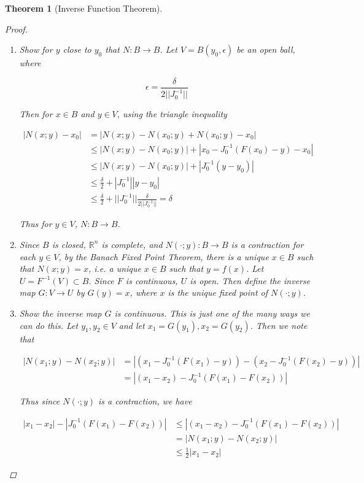 \documentclass{article}
\newtheorem{theorem}{Theorem}[section]
\def\R{{\mathbb R}}
\begin{document}
\begin{theorem}[Inverse Function Theorem]
\begin{proof}
\begin{enumerate}
In other words, on the closed ball $B$, $N$ is Lipschitz with Lipschitz constant 1/2, thus a contraction. 

\item Show for $y$ close to $y_0$ that $N: B \rightarrow B$. Let $V = B(y_0, \epsilon)$ be an open ball, where

\[
\epsilon = \frac{\delta}{ 2 ||J_0^{-1}||}
\]

Then for $x \in B$ and $y \in V$, using the triangle inequality

\begin{align*}
|N(x; y) - x_0| &= |N(x; y) - N(x_0; y) + N(x_0; y) - x_0| \\
&\leq |N(x; y) - N(x_0; y)| + |x_0 - J_0^{-1}(F(x_0) - y) - x_0| \\
&\leq |N(x; y) - N(x_0; y)| + |J_0^{-1}(y - y_0)| \\
&\leq \frac{\delta}{2} + |J_0^{-1}||y - y_0| \\
&\leq \frac{\delta}{2} + ||J_0^{-1}||\frac{\delta}{ 2 ||J_0^{-1}||} = \delta 
\end{align*}

Thus for $y \in V$, $N: B \rightarrow B$.

\item Since $B$ is closed, $\R^n$ is complete, and $N(\cdot; y): B \rightarrow B$ is a contraction for each $y \in V$, by the Banach Fixed Point Theorem, there is a unique $x \in B$ such that $N(x; y) = x$, i.e. a unique $x \in B$ such that $y = f(x)$. Let $U = F^{-1}(V) \subset B$. Since $F$ is continuous, $U$ is open. Then define the inverse map $G: V \rightarrow U$ by $G(y) = x$, where $x$ is the unique fixed point of $N(\cdot; y)$.

\item Show the inverse map $G$ is continuous. This is just one of the many ways we can do this. Let $y_1, y_2 \in V$ and let $x_1 = G(y_1), x_2 = G(y_2)$. Then we note that

\begin{align*}
|N(x_1; y) - N(x_2; y)| &= |(x_1 - J_0^{-1}(F(x_1) - y)) - (x_2 - J_0^{-1}(F(x_2) - y))| \\
&= |(x_1 - x_2) - J_0^{-1} (F(x_1) - F(x_2))|
\end{align*}

Thus since $N(\cdot; y)$ is a contraction, we have

\begin{align*}
|x_1 - x_2| - |J_0^{-1} (F(x_1) - F(x_2))| &\leq |(x_1 - x_2) - J_0^{-1} (F(x_1) - F(x_2))| \\
&= |N(x_1; y) - N(x_2; y)| \\
&\leq \frac{1}{2}|x_1 - x_2|
\end{align*}


\end{enumerate}
\end{proof}
\end{theorem}
\end{document}
